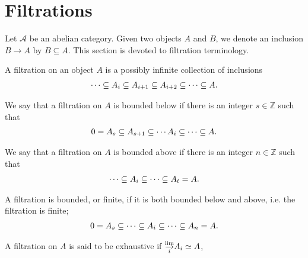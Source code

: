 \documentclass[../thesis.tex]{subfiles}
\begin{document}
    \section{Filtrations}
        Let $\mathcal{A}$ be an abelian category. Given two objects $A$ and $B$, we denote an inclusion $B \rightarrow A$ by $B \subseteq A$. This section is devoted to filtration terminology.

        \begin{definition}[Filtration]
            A filtration on an object $A$ is a possibly infinite collection of inclusions
            \begin{align*}
                \cdots \subseteq A_{i} \subseteq A_{i+1} \subseteq A_{i+2} \subseteq \cdots \subseteq A\tt{.}
            \end{align*}
        \end{definition}

        \begin{definition}
            We say that a filtration on $A$ is bounded below if there is an integer $s \in \mathbb{Z}$ such that
            \begin{align*}
                0 = A_s \subseteq A_{s+1} \subseteq \cdots A_i \subseteq \cdots \subseteq A\tt{.}
            \end{align*}

            We say that a filtration on $A$ is bounded above if there is an integer $n \in \mathbb{Z}$ such that
            \begin{align*}
                \cdots \subseteq A_i \subseteq \cdots \subseteq A_t = A\tt{.}
            \end{align*}

            A filtration is bounded, or finite, if it is both bounded below and above, i.e. the filtration is finite;
            \begin{align*}
                0 = A_s \subseteq \cdots \subseteq A_i \subseteq \cdots \subseteq A_n = A\tt{.}
            \end{align*}
        \end{definition}

        \begin{definition}
            A filtration on $A$ is said to be exhaustive if $\substack{\varinjlim \\ i} A_i \simeq A$,
            \begin{center}
            \end{center}
        \end{definition}
\end{document}
